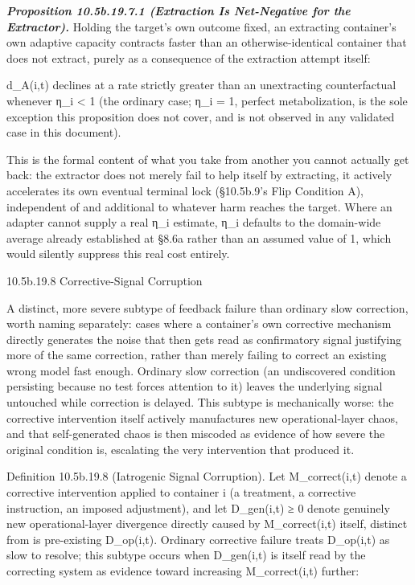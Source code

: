 \documentclass[
]{article}
\begin{document}
\emph{\textbf{Proposition 10.5b.19.7.1 (Extraction Is Net-Negative for
the Extractor).}} Holding the target's own outcome fixed, an extracting
container's own adaptive capacity contracts faster than an
otherwise-identical container that does not extract, purely as a
consequence of the extraction attempt itself:

d\_A(i,t) declines at a rate strictly greater than an unextracting
counterfactual whenever η\_i \textless{} 1 (the ordinary case; η\_i = 1,
perfect metabolization, is the sole exception this proposition does not
cover, and is not observed in any validated case in this document).

This is the formal content of what you take from another you cannot
actually get back: the extractor does not merely fail to help itself by
extracting, it actively accelerates its own eventual terminal lock
(§10.5b.9's Flip Condition A), independent of and additional to whatever
harm reaches the target. Where an adapter cannot supply a real η\_i
estimate, η\_i defaults to the domain-wide average already established
at §8.6a rather than an assumed value of 1, which would silently
suppress this real cost entirely.

10.5b.19.8 Corrective-Signal Corruption

A distinct, more severe subtype of feedback failure than ordinary slow
correction, worth naming separately: cases where a container's own
corrective mechanism directly generates the noise that then gets read as
confirmatory signal justifying more of the same correction, rather than
merely failing to correct an existing wrong model fast enough. Ordinary
slow correction (an undiscovered condition persisting because no test
forces attention to it) leaves the underlying signal untouched while
correction is delayed. This subtype is mechanically worse: the
corrective intervention itself actively manufactures new
operational-layer chaos, and that self-generated chaos is then miscoded
as evidence of how severe the original condition is, escalating the very
intervention that produced it.

Definition 10.5b.19.8 (Iatrogenic Signal Corruption). Let
M\_correct(i,t) denote a corrective intervention applied to container i
(a treatment, a corrective instruction, an imposed adjustment), and let
D\_gen(i,t) ≥ 0 denote genuinely new operational-layer divergence
directly caused by M\_correct(i,t) itself, distinct from is pre-existing
D\_op(i,t). Ordinary corrective failure treats D\_op(i,t) as slow to
resolve; this subtype occurs when D\_gen(i,t) is itself read by the
correcting system as evidence toward increasing M\_correct(i,t) further:
\end{document}
